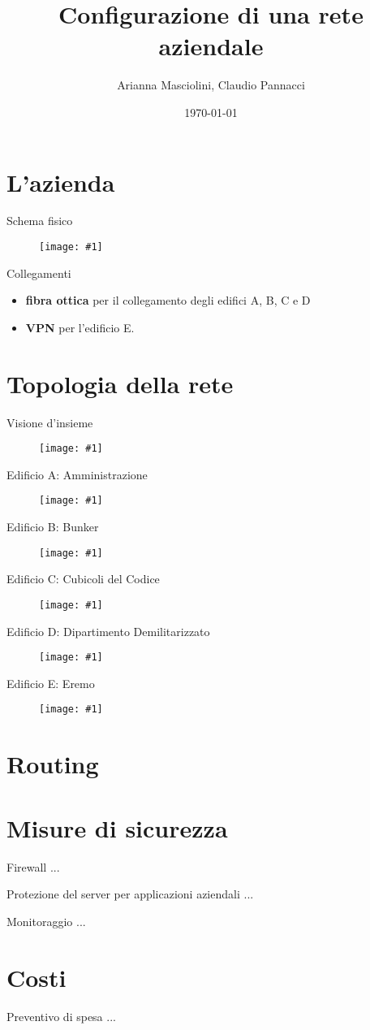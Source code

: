 \documentclass{beamer}
\title{Configurazione di una rete aziendale}
\date{\today}
\author{Arianna Masciolini, Claudio Pannacci}
\institute{Università degli Studi di Perugia}
\def\image[#1][#2]{
  \begin{figure}[H]
  \centering
  \texttt{[image: \#1]}
  \end{figure}}
\begin{document}
  \maketitle
  \section{L'azienda}
  	\begin{frame}{Schema fisico}
    	\image[schema_fisico.png][scale=0.30]
  	\end{frame}
  	\begin{frame}{Collegamenti}
  		\begin{itemize}
  			\item \textbf{fibra ottica} per il collegamento degli edifici A, B, C e D
  			\item \textbf{VPN} per l'edificio E.
  		\end{itemize}
  	\end{frame}
  \section{Topologia della rete}
  	\begin{frame}{Visione d'insieme}
  		\image[schema_logico.png][scale=0.25]
  	\end{frame}
  	\begin{frame}{Edificio A: Amministrazione}
  		\image[ed_a.png][scale=0.50]
  	\end{frame}
  	\begin{frame}{Edificio B: Bunker}
  		\image[ed_b.png][scale=0.50]
  	\end{frame}
  	\begin{frame}{Edificio C: Cubicoli del Codice}
  		\image[ed_c.png][scale=0.50]
  	\end{frame}
  	\begin{frame}{Edificio D: Dipartimento Demilitarizzato}
  		\image[ed_d.png][scale=0.50]
  	\end{frame}
  	\begin{frame}{Edificio E: Eremo}
  		\image[ed_e.png][scale=0.50]
  	\end{frame}
  \section{Routing}
  \section{Misure di sicurezza}
  	\begin{frame}{Firewall}
  		...
  	\end{frame}
  	\begin{frame}{Protezione del server per applicazioni aziendali}
  		...
  	\end{frame}
  	\begin{frame}{Monitoraggio}
  		...
  	\end{frame}
  \section{Costi}
  \begin{frame}{Preventivo di spesa}
  		...
  	\end{frame}
\end{document}
